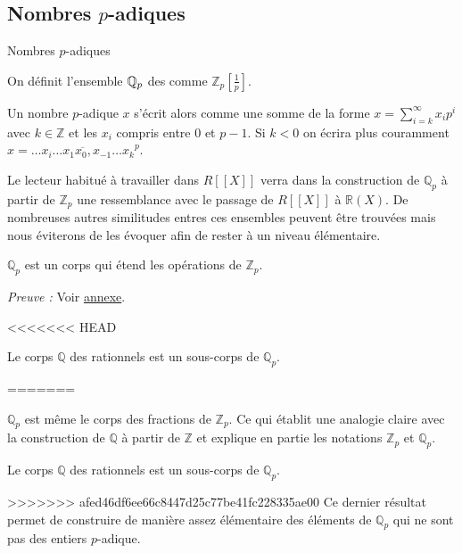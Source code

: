 \subsection{Nombres \texorpdfstring{$p$}{p}-adiques}

\begin{definition} Nombres $p$-adiques 


	On définit l'ensemble $\mathbb{Q}_p$ des  comme $\mathbb{Z}_p \left[ \frac{1}{p} \right] $.
\end{definition}

Un nombre $p$-adique $x$ s'écrit alors comme une somme de la forme $x = \sum \limits_{i=k}^{\infty} x_{i} p^i$ avec $k \in \mathbb{Z}$ et les $x_{i}$ compris entre $0$ et $p-1$. Si $k<0$ on écrira plus couramment $x = \overline{\ldots x_i \ldots x_1 x_0 , x_{-1}\ldots x_{k}}^p$.

\begin{remarque}
Le lecteur habitué à travailler dans $R[[X]]$ verra dans la construction de $\mathbb{Q}_{p} $ à partir de $\mathbb{Z}_p$ une ressemblance avec le passage de $R[[X]]$ à $\mathbb{R}\left( X \right) $. De nombreuses autres similitudes entres ces ensembles peuvent être trouvées mais nous éviterons de les évoquer afin de rester à un niveau élémentaire.

\end{remarque}
\begin{propriete}
\label{qpcorps} 
	$\mathbb{Q}_{p}$ est un corps qui étend les opérations de $\mathbb{Z}_p$.
\end{propriete}
\textit{Preuve :} Voir \hyperlink{qpcorpspreuve}{annexe}.   

<<<<<<< HEAD
\begin{corollaire}
	Le corps $\mathbb{Q}$ des rationnels est un sous-corps de $\mathbb{Q}_{p} $.
\end{corollaire}
=======
\begin{remarque}
	$\mathbb{Q}_{p}$ est même le corps des fractions de $\mathbb{Z}_p$. Ce qui établit une analogie claire avec la construction de $\mathbb{Q}$ à partir de $\mathbb{Z}$ et explique en partie les notations $\mathbb{Z}_p$ et $\mathbb{Q}_{p} $. 
\end{remarque}
\begin{corollaire}
	Le corps $\mathbb{Q}$ des rationnels est un sous-corps de $\mathbb{Q}_{p} $.
\end{corollaire}
>>>>>>> afed46df6ee66c8447d25c77be41fc228335ae00
Ce dernier résultat permet de construire de manière assez élémentaire des éléments de $\mathbb{Q}_{p}$ qui ne sont pas des entiers $p$-adique.

